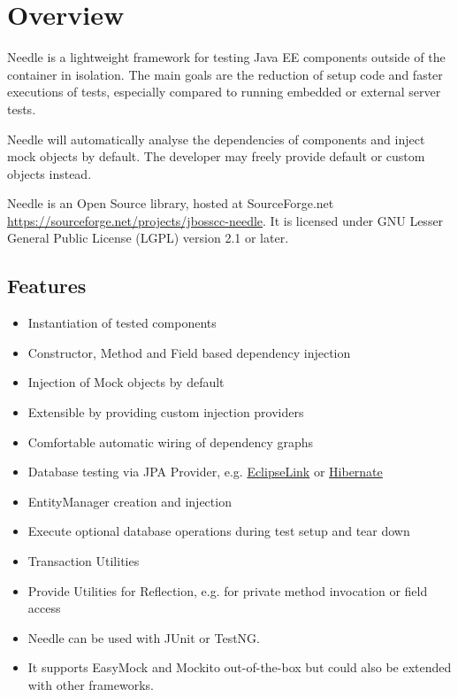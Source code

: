 \chapter{Overview}

Needle is a lightweight framework for testing Java EE components outside of the
container in isolation. The main goals are the reduction of setup code
and faster executions of tests, especially compared to running embedded or external server tests.

Needle will automatically analyse the dependencies of components and inject
mock objects by default. The developer may freely provide default or custom objects instead.

\parindent 0pt
Needle is an Open Source library, hosted at SourceForge.net \url{https://sourceforge.net/projects/jbosscc-needle}.
It is licensed under GNU Lesser General Public License (LGPL) version 2.1 or later.
	
\section{Features}
\begin{itemize}
	\item Instantiation of tested components
	\item Constructor, Method and Field based dependency injection
	\item Injection of Mock objects by default
	\item Extensible by providing custom injection providers
	\item Comfortable automatic wiring of dependency graphs

	\item Database testing via JPA Provider, e.g. \href{http://www.eclipse.org/eclipselink/}{EclipseLink} or \href{http://www.hibernate.org}{Hibernate}
	\item EntityManager creation and injection
	\item Execute optional database operations during test setup and tear down
	\item Transaction Utilities

	\item Provide Utilities for Reflection, e.g. for private method invocation or field access

	\item Needle can be used with JUnit or TestNG.
	\item It supports EasyMock and Mockito out-of-the-box but could also be extended with other frameworks.
\end{itemize}

